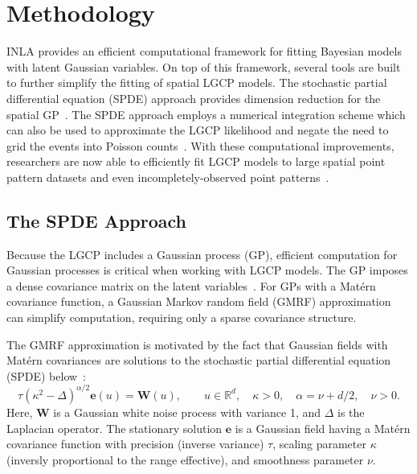 \documentclass[]{interact}
\begin{document}
\section{Methodology}
\label{methods}

INLA provides an efficient computational framework for fitting Bayesian models
with latent Gaussian variables. On top of this framework, several tools are
built to further simplify the fitting of spatial LGCP models. The stochastic
partial differential equation (SPDE) approach provides dimension reduction for
the spatial GP~\cite{lindgrenetal}. The SPDE approach employs a numerical
integration scheme which can also be used to approximate the LGCP likelihood
and negate the need to grid the events into Poisson counts~\cite{simpsonetal}.
With these computational improvements, researchers are now able to efficiently
fit LGCP models to large spatial point pattern datasets and even
incompletely-observed point patterns~\cite{yuanetal}.  


\subsection{The SPDE Approach}
\label{spde}

Because the LGCP includes a Gaussian process (GP), efficient computation for
Gaussian processes is critical when working with LGCP models. The GP imposes a
dense covariance matrix on the latent variables~\cite{rinla}. For GPs with a
Mat\'{e}rn covariance function, a Gaussian Markov random field (GMRF)
approximation can simplify computation, requiring only a sparse covariance
structure.

The GMRF approximation is motivated by the fact that Gaussian fields with
Mat\'{e}rn covariances are solutions to the stochastic partial differential
equation (SPDE) below~\cite{lindgrenetal}:
\begin{displaymath}
\tau(\kappa^{2} - \Delta)^{\alpha / 2} \mathbf{e}(u) = \mathbf{W}(u),
\qquad u \in \mathbb{R}^d, \quad \kappa > 0,
\quad \alpha = \nu + d/2, \quad \nu > 0.
\end{displaymath}
Here, \(\mathbf{W}\) is a Gaussian white noise process with variance 1, and
\(\Delta\) is the Laplacian operator. The stationary solution
\(\mathbf{e}\) is a Gaussian field having a Mat\'{e}rn covariance
function with precision (inverse variance) \(\tau\),  scaling parameter
\(\kappa\) (inversly proportional to the range effective), and smoothness
parameter \(\nu\).
\end{document}
